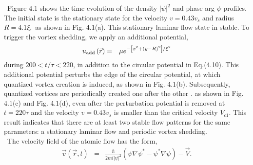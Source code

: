 \documentclass[12pt,a4paper]{report}
\begin{document}
\ Figure 4.1 shows the time evolution of the density $|\psi|^2$
and phase arg $\psi$ profiles. The initial state is the stationary
state for the velocity $v=0.43 v_s$ and radius $R=4.1 \xi,$
as shown in Fig. 4.1(a). This stationary laminar flow state
in stable. To trigger the vortex shedding, we apply an
additional potential,
\begin{eqnarray}
u_{{\rm add}} \left( \vec{r} \right) & = & 
\mu e^{- \left[ x^2 + \left( y - R\right)^2 \right] / \xi^2}
\end{eqnarray}
during $200 < t/\tau < 220$, in addition to the circular 
potential in Eq.(4.10). This additional potential perturbs the
edge of the circular potential, at which quantized vortex
creation is induced, as shown in Fig. 4.1(b). Subsequently,
quantized vortices are periodically created one after the other \cite{52}.
as shown in Fig. 4.1(c) and Fig. 4.1(d), even after the 
perturbation potential is removed at $t=220 \tau$ and the
velocity $v= 0.43 v_s$ is smaller than the critical velocity
$V_{c1}$. This result indicates that there are at least
two stable flow patterns for the same parameters: a stationary
laminar flow and periodic vortex shedding.
\\
\ The velocity field of the atomic flow has the form,
\begin{eqnarray}
\vec{v} \left( \vec{r}, t \right) & = &
\frac{\hbar}{2 m i | \psi |^2} \left( \psi \nabla \psi^* - \psi^* \nabla \psi \right) - \vec{V}.
\end{eqnarray}
\end{document}
